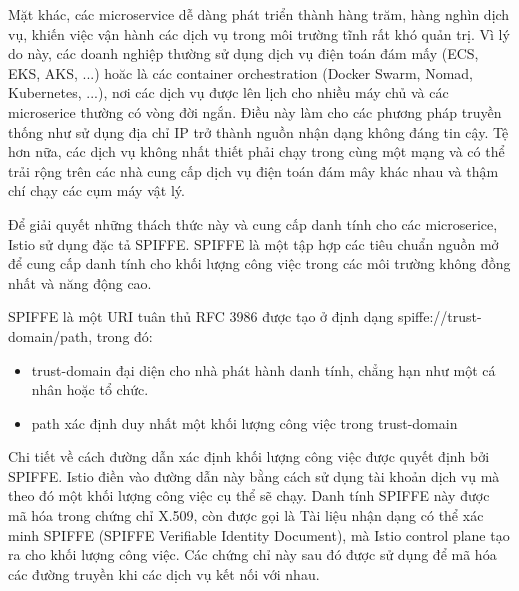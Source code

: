\documentclass[14pt,a4paper]{book}
\begin{document}
{{			Mặt khác, các microservice dễ dàng phát triển thành hàng trăm, hàng nghìn dịch vụ, khiến việc vận hành các dịch vụ trong môi trường tĩnh rất khó quản trị. Vì lý do này, các doanh nghiệp thường sử dụng dịch vụ điện toán đám mấy (ECS, EKS, AKS, ...) hoăc là các container orchestration (Docker Swarm, Nomad, Kubernetes, ...), nơi các dịch vụ được lên lịch cho nhiều máy chủ và các microserice thường có vòng đời ngắn. Điều này làm cho các phương pháp truyền thống như sử dụng địa chỉ IP trở thành nguồn nhận dạng không đáng tin cậy. Tệ hơn nữa, các dịch vụ không nhất thiết phải chạy trong cùng một mạng và có thể trải rộng trên các nhà cung cấp dịch vụ điện toán đám mây khác nhau và thậm chí chạy các cụm máy vật lý.
			
			Để giải quyết những thách thức này và cung cấp danh tính cho các microserice, Istio sử dụng đặc tả SPIFFE. SPIFFE là một tập hợp các tiêu chuẩn nguồn mở để cung cấp danh tính cho khối lượng công việc trong các môi trường không đồng nhất và năng động cao.
			
			SPIFFE là một URI tuân thủ RFC 3986 được tạo ở định dạng spiffe://trust-domain/path, trong đó:
			\begin{itemize}
				\item trust-domain đại diện cho nhà phát hành danh tính, chẳng hạn như một cá nhân hoặc tổ chức.
				\item path xác định duy nhất một khối lượng công việc trong trust-domain
			\end{itemize}
		
			Chi tiết về cách đường dẫn xác định khối lượng công việc được quyết định bởi SPIFFE. Istio điền vào đường dẫn này bằng cách sử dụng tài khoản dịch vụ mà theo đó một khối lượng công việc cụ thể sẽ chạy. Danh tính SPIFFE này được mã hóa trong chứng chỉ X.509, còn được gọi là Tài liệu nhận dạng có thể xác minh SPIFFE (SPIFFE Verifiable Identity Document), mà Istio control plane tạo ra cho khối lượng công việc. Các chứng chỉ này sau đó được sử dụng để mã hóa các đường truyền khi các dịch vụ kết nối với nhau.
		
}}
\end{document}
